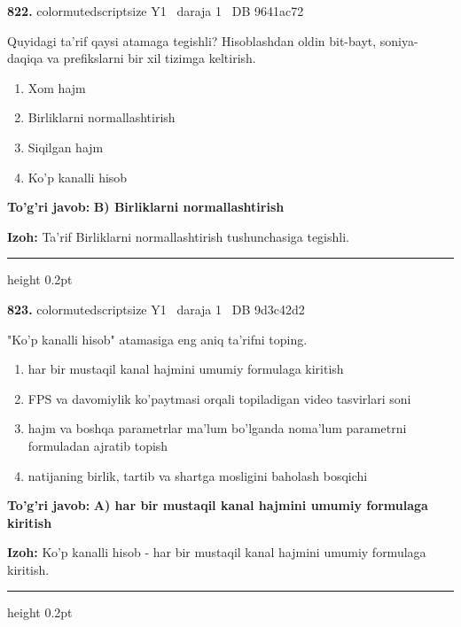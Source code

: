 \documentclass[10pt,a4paper,oneside]{article}
\begin{document}
\noindent\textbf{\color{ink}822.}  {color{muted}scriptsize Y1 \textbullet\ daraja 1 \textbullet\ DB 9641ac72}
\par
Quyidagi ta'rif qaysi atamaga tegishli? Hisoblashdan oldin bit-bayt, soniya-daqiqa va prefikslarni bir xil tizimga keltirish.
\begin{enumerate}[label=\Alph*),leftmargin=9mm]
\item Xom hajm
\item Birliklarni normallashtirish
\item Siqilgan hajm
\item Ko'p kanalli hisob
\end{enumerate}
\begin{tcolorbox}[enhanced,breakable,colback=teal!4,colframe=teal!50!black,boxrule=0.5pt,arc=1.1mm,left=3mm,right=3mm,top=1.7mm,bottom=1.7mm,before skip=2mm,after skip=2mm]
\textbf{\color{teal}To'g'ri javob:} \textbf{B) Birliklarni normallashtirish}
\par\smallskip
\textbf{Izoh:} Ta'rif Birliklarni normallashtirish tushunchasiga tegishli.
\end{tcolorbox}
\vspace{2mm}\hrule height 0.2pt \vspace{3mm}

\noindent\textbf{\color{ink}823.}  {color{muted}scriptsize Y1 \textbullet\ daraja 1 \textbullet\ DB 9d3c42d2}
\par
"Ko'p kanalli hisob" atamasiga eng aniq ta'rifni toping.
\begin{enumerate}[label=\Alph*),leftmargin=9mm]
\item har bir mustaqil kanal hajmini umumiy formulaga kiritish
\item FPS va davomiylik ko'paytmasi orqali topiladigan video tasvirlari soni
\item hajm va boshqa parametrlar ma'lum bo'lganda noma'lum parametrni formuladan ajratib topish
\item natijaning birlik, tartib va shartga mosligini baholash bosqichi
\end{enumerate}
\begin{tcolorbox}[enhanced,breakable,colback=teal!4,colframe=teal!50!black,boxrule=0.5pt,arc=1.1mm,left=3mm,right=3mm,top=1.7mm,bottom=1.7mm,before skip=2mm,after skip=2mm]
\textbf{\color{teal}To'g'ri javob:} \textbf{A) har bir mustaqil kanal hajmini umumiy formulaga kiritish}
\par\smallskip
\textbf{Izoh:} Ko'p kanalli hisob - har bir mustaqil kanal hajmini umumiy formulaga kiritish.
\end{tcolorbox}
\vspace{2mm}\hrule height 0.2pt \vspace{3mm}
\end{document}
